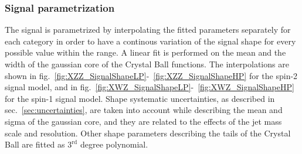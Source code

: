 


\subsubsection{Signal parametrization}
\label{ssec:signal_parametrization}

The signal is parametrized by interpolating the fitted parameters separately for each category in order to have a continous variation of the signal shape for every possible \mtVZ value within the range. A linear fit is performed on the mean and the width of the gaussian core of the Crystal Ball functions. The interpolations are shown in fig.~\ref{fig:XZZ_SignalShapeLP}-~\ref{fig:XZZ_SignalShapeHP} for the spin-2 signal model, and in fig.~\ref{fig:XWZ_SignalShapeLP}-~\ref{fig:XWZ_SignalShapeHP} for the spin-1 signal model. Shape systematic uncertainties, as described in sec.~\ref{sec:uncertainties}, are taken into account while describing the mean and sigma of the gaussian core, and they are related to the effects of the jet mass scale and resolution. Other shape parameters describing the tails of the Crystal Ball are fitted as $3^{\text{rd}}$ degree polynomial.



